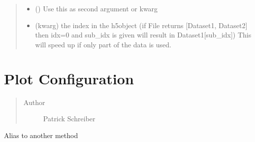 \documentclass[letterpaper,10pt,openany,oneside,english]{sphinxmanual}
\begin{document}
\begin{fulllineitems}
\begin{fulllineitems}
\begin{quote}
\begin{description}
\begin{itemize}
\item {} 
 () \textendash{} Use this as second argument or kwarg

\item {} 
 \textendash{} (kwarg) the index in the h5object (if File returns {[}Dataset1, Dataset2{]} then idx=0 and sub\_idx is given will result in Dataset1{[}sub\_idx{]}) This will speed up if only part of the data is used.

\end{itemize}

\end{description}\end{quote}

\end{fulllineitems}


\end{fulllineitems}

\label{\detokenize{config:module-config}}

\chapter{Plot Configuration}
\label{\detokenize{config::doc}}\label{\detokenize{config:config}}\label{\detokenize{config:plot-configuration}}\begin{quote}\begin{description}
\item[{Author}] \leavevmode
Patrick Schreiber

\end{description}\end{quote}

\begin{fulllineitems}
\label{\detokenize{config:config.Alias}}
Alias to another method

\end{fulllineitems}


\begin{fulllineitems}
\label{\detokenize{config:config.StyleError}}
\end{fulllineitems}
\end{document}
